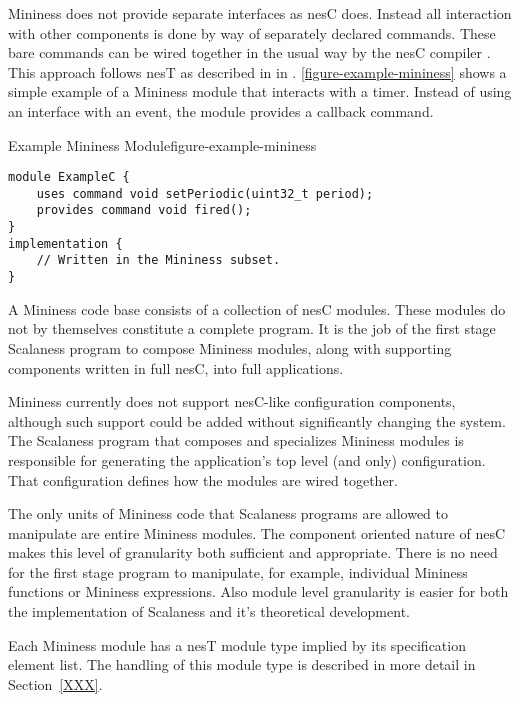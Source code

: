 
Mininess does not provide separate interfaces as nesC does. Instead all interaction with other
components is done by way of separately declared commands. These bare commands can be wired
together in the usual way by the nesC compiler \cite{Gay-nesC-2003}. This approach follows nesT
as described in in \cite{FramedML,nesT}. \autoref{figure-example-mininess} shows a simple
example of a Mininess module that interacts with a timer. Instead of using an interface with an
event, the module provides a callback command.

\singlespace
\begin{fpfig}[tbhp]{Example Mininess Module}{figure-example-mininess}
{
\begin{lstlisting}[language=nesC]
module ExampleC {
    uses command void setPeriodic(uint32_t period);
    provides command void fired();
}
implementation {
    // Written in the Mininess subset.
}
\end{lstlisting}
}
\end{fpfig}
\primaryspacing

A Mininess code base consists of a collection of nesC modules. These modules do not by
themselves constitute a complete program. It is the job of the first stage Scalaness program to
compose Mininess modules, along with supporting components written in full nesC, into full
applications.

Mininess currently does not support nesC-like configuration components, although such support
could be added without significantly changing the system. The Scalaness program that composes
and specializes Mininess modules is responsible for generating the application's top level (and
only) configuration. That configuration defines how the modules are wired together. 

The only units of Mininess code that Scalaness programs are allowed to manipulate are entire
Mininess modules. The component oriented nature of nesC makes this level of granularity both
sufficient and appropriate. There is no need for the first stage program to manipulate, for
example, individual Mininess functions or Mininess expressions. Also module level granularity is
easier for both the implementation of Scalaness and it's theoretical development. 

Each Mininess module has a nesT module type implied by its specification element list. The
handling of this module type is described in more detail in Section~\ref{XXX}.

